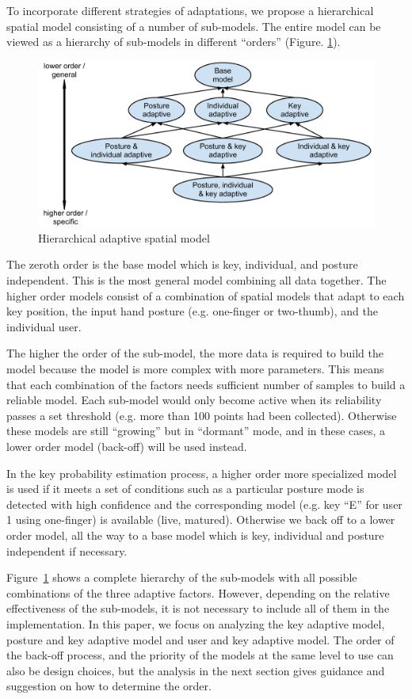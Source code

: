 \documentclass{sigchi}
\begin{document}
To incorporate different strategies of adaptations, we propose a hierarchical
spatial model consisting of a number of sub-models.
The entire model can be viewed as a hierarchy of sub-models in different
“orders” (Figure. \ref{fig:hierarchy}).

\begin{figure}[tb]
  \centering
  \includegraphics[width=0.9\columnwidth]{figures/hierarchy.pdf}
  \caption{Hierarchical adaptive spatial model}
  \label{fig:hierarchy}
\end{figure}

The zeroth order is the base model which is key, individual, and posture
independent. This is the most general model combining all data together. The
higher order models consist of a combination of spatial models that adapt to each
key position, the input hand 
posture (e.g. one-finger or two-thumb), and the individual user. 

The higher the order of the sub-model, the more data is required to build the model because
the model is more complex with more parameters. This means that each combination of the 
factors needs sufficient number of samples to build a reliable model. Each 
sub-model would only become active when its reliability passes a set 
threshold (e.g. more than 100 points had been collected). Otherwise these models
are still ``growing'' but in ``dormant'' mode, and in these cases, a lower order model (back-off) will
be used instead.

In the key probability estimation process, a higher order more specialized model
is used if it meets a set of conditions such as a particular posture mode is detected with high 
confidence and the corresponding model (e.g. key ``E'' for user 1 using
one-finger) is available (live, matured).
Otherwise we back off to a lower order model, all the way to a base model which 
is key, individual and posture independent if necessary. 

Figure~\ref{fig:hierarchy} shows a complete hierarchy of the sub-models with all
possible combinations of the three adaptive factors. However, depending on the
relative effectiveness of the sub-models, it is not necessary to include all of
them in the implementation. In this paper, we focus on analyzing the key
adaptive model, posture and key adaptive model and user and key adaptive model.
The order of the
back-off process, and the priority of the models at the same level to use can
also be design choices, but the analysis in the next section gives
guidance and suggestion on how to determine the order.
\end{document}
